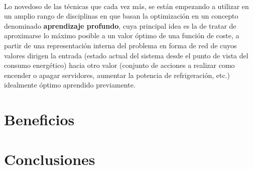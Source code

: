 \documentclass[10pt]{article}
\begin{document}
			\paragraph{}
			Lo novedoso de las técnicas que cada vez más, se están empezando a utilizar en un amplio rango de disciplinas en que basan la optimización en un concepto denominado \textbf{aprendizaje profundo}, cuya principal idea es la de tratar de aproximarse lo máximo posible a un valor óptimo de una función de coste, a partir de una representación interna del problema en forma de red de  cuyos valores dirigen la entrada (estado actual del sistema desde el punto de vista del consumo energético) hacia otro valor (conjunto de acciones a realizar como encender o apagar servidores, aumentar la potencia de refrigeración, etc.) idealmente óptimo aprendido previamente.


  \section{Beneficios}
	\label{sec:beneficios}

  	\paragraph{}

  \section{Conclusiones}
	\label{sec:conclusiones}
\end{document}

